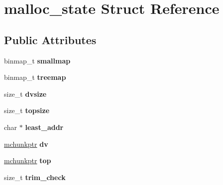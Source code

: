 \hypertarget{structmalloc__state}{\section{malloc\-\_\-state Struct Reference}
\label{structmalloc__state}
}
\subsection*{Public Attributes}
\begin{DoxyCompactItemize}
\item 
\hypertarget{structmalloc__state_a9e597125e4a96b39d3859c59fee38c49}{binmap\-\_\-t {\bfseries smallmap}}\label{structmalloc__state_a9e597125e4a96b39d3859c59fee38c49}

\item 
\hypertarget{structmalloc__state_ae20bf1bcda1838e5bc07d2395ba72283}{binmap\-\_\-t {\bfseries treemap}}\label{structmalloc__state_ae20bf1bcda1838e5bc07d2395ba72283}

\item 
\hypertarget{structmalloc__state_ae2e6a3ed8e8abaf03e47917057f1012d}{size\-\_\-t {\bfseries dvsize}}\label{structmalloc__state_ae2e6a3ed8e8abaf03e47917057f1012d}

\item 
\hypertarget{structmalloc__state_aa93901fa8e414a7d7881ee968b097eea}{size\-\_\-t {\bfseries topsize}}\label{structmalloc__state_aa93901fa8e414a7d7881ee968b097eea}

\item 
\hypertarget{structmalloc__state_a70963271ac277cbaf615458631ab2d42}{char $\ast$ {\bfseries least\-\_\-addr}}\label{structmalloc__state_a70963271ac277cbaf615458631ab2d42}

\item 
\hypertarget{structmalloc__state_a840943ad4baaddbaaa5defe954ec06b9}{\hyperlink{structmalloc__chunk}{mchunkptr} {\bfseries dv}}\label{structmalloc__state_a840943ad4baaddbaaa5defe954ec06b9}

\item 
\hypertarget{structmalloc__state_a594c4d03c189612e0ce91f7aba8dae77}{\hyperlink{structmalloc__chunk}{mchunkptr} {\bfseries top}}\label{structmalloc__state_a594c4d03c189612e0ce91f7aba8dae77}

\item 
\hypertarget{structmalloc__state_a30209a5277132d0f207c7a850d225324}{size\-\_\-t {\bfseries trim\-\_\-check}}\label{structmalloc__state_a30209a5277132d0f207c7a850d225324}


\end{DoxyCompactItemize}
